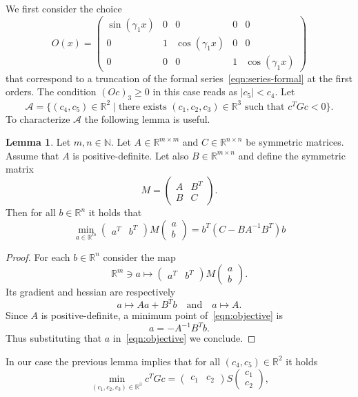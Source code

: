\documentclass[a4paper,10pt,oneside]{amsbook}
\numberwithin{section}{chapter}
\numberwithin{equation}{chapter}
\theoremstyle{definition}
\newtheorem{lemma}[prop]{Lemma}
\begin{document}
We first consider the choice
\[
O(x)=\begin{pmatrix}
\sin(\gamma_1x) & 0 & 0 & 0 & 0 \\
0 & 1 & \cos(\gamma_1x) & 0 & 0 \\
0 & 0 & 0 & 1 & \cos(\gamma_1x)
\end{pmatrix}
\]
that correspond to a truncation of the formal series~\eqref{eqn:series-formal} at the first orders. The condition $(Oc)_3\ge0$ in this case reads as $|c_5|<c_4$. Let
\[
\mathscr{A}=\{(c_4,c_5)\in\mathbb{R}^2\;|\;\text{there exists $(c_1,c_2,c_3)\in\mathbb{R}^3$ such that $c^TGc<0$}\}.
\]
To characterize $\mathscr{A}$ the following lemma is useful.
\begin{lemma}
Let $m,n\in\mathbb{N}$. Let $A\in\mathbb{R}^{m\times m}$ and $C\in\mathbb{R}^{n\times n}$ be symmetric matrices. Assume that $A$ is positive-definite. Let also $B\in\mathbb{R}^{m\times n}$ and define the symmetric matrix
\[
M=\begin{pmatrix}
A & B^T \\
B & C
\end{pmatrix}.
\]
Then for all $b\in\mathbb{R}^n$ it holds that
\[
\min_{a\in\mathbb{R}^m}\begin{pmatrix}
a^T & b^T
\end{pmatrix}
M
\begin{pmatrix}
a \\
b
\end{pmatrix}=b^T(C-BA^{-1}B^T)b
\]
\end{lemma}
\begin{proof}
For each $b\in\mathbb{R}^n$ consider the map
\begin{equation}
\label{eqn:objective}
\mathbb{R}^m\ni a\mapsto
\begin{pmatrix}
a^T & b^T
\end{pmatrix}
M
\begin{pmatrix}
a \\
b
\end{pmatrix}.
\end{equation}
Its gradient and hessian are respectively
\[
a\mapsto Aa+B^Tb\quad\text{and}\quad a\mapsto A.
\]
Since $A$ is positive-definite, a minimum point of~\eqref{eqn:objective} is
\[
a=-A^{-1}B^Tb.
\]
Thus substituting that $a$ in~\eqref{eqn:objective} we conclude.
\end{proof}
In our case the previous lemma implies that for all $(c_4,c_5)\in\mathbb{R}^2$ it holds
\[
\min_{(c_1,c_2,c_3)\in\mathbb{R}^3}c^TGc=\begin{pmatrix}
c_1 & c_2
\end{pmatrix}
S
\begin{pmatrix}
c_1 \\ c_2
\end{pmatrix},
\]
\end{document}
